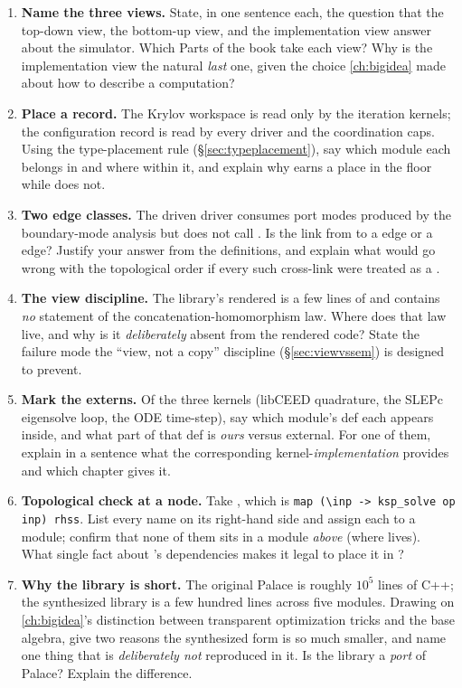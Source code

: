 \exercisessection
\begin{enumerate}[nosep]
  \item \textbf{Name the three views.} State, in one sentence each, the question
  that the top-down view, the bottom-up view, and the implementation view answer
  about the simulator. Which Parts of the book take each view? Why is the
  implementation view the natural \emph{last} one, given the choice
  \cref{ch:bigidea} made about how to describe a computation?
  \item \textbf{Place a record.} The Krylov workspace  is read only by
  the iteration kernels; the configuration record  is read by every
  driver and the coordination caps. Using the type-placement rule
  (\S\ref{sec:typeplacement}), say which module each belongs in and where within
  it, and explain why  earns a place in the  floor while
   does not.
  \item \textbf{Two edge classes.} The driven driver consumes port modes produced by
  the boundary-mode analysis but does not call . Is the link
  from  to  a  edge or a
   edge? Justify your answer from the definitions, and explain what
  would go wrong with the topological order if every such cross-link were treated as
  a .
  \item \textbf{The view discipline.} The library's rendered 
  is a few lines of  and contains \emph{no} statement of the
  concatenation-homomorphism law. Where does that law live, and why is it
  \emph{deliberately} absent from the rendered code? State the failure mode the
  ``view, not a copy'' discipline (\S\ref{sec:viewvssem}) is designed to prevent.
  \item \textbf{Mark the externs.} Of the three  kernels (libCEED
  quadrature, the SLEPc eigensolve loop, the ODE time-step), say which module's def
  each appears inside, and what part of that def is \emph{ours} versus external. For
  one of them, explain in a sentence what the corresponding kernel-\emph{implementation}
  provides and which chapter gives it.
  \item \textbf{Topological check at a node.} Take , which is
  \lstinline[style=l4style]|map (\inp -> ksp_solve op inp) rhss|. List every name on
  its right-hand side and assign each to a module; confirm that none of them sits in
  a module \emph{above}  (where  lives). What
  single fact about 's dependencies makes it legal to place it in
  ?
  \item \textbf{Why the library is short.} The original Palace is roughly
  $10^5$ lines of C++; the synthesized library is a few hundred lines across five
  modules. Drawing on \cref{ch:bigidea}'s distinction between transparent
  optimization tricks and the base algebra, give two reasons the synthesized form is
  so much smaller, and name one thing that is \emph{deliberately not} reproduced in
  it. Is the library a \emph{port} of Palace? Explain the difference.
\end{enumerate}
